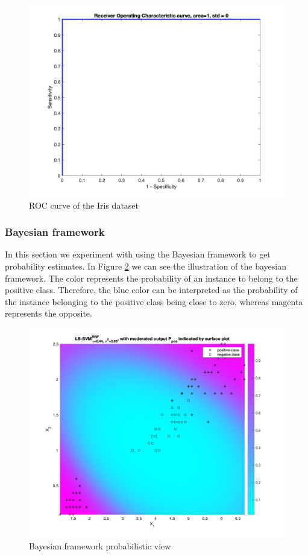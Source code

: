 \documentclass[a4paper, 11pt, one column]{article}
\begin{document}
\begin{figure}[]
    \centering
    \includegraphics[width=12cm]{images/simplex_ROC_dataset.png}
    \caption{ROC curve of the Iris dataset}
    \label{fig:ROCiris}
\end{figure}


\subsubsection{Bayesian framework}
In this section we experiment with using the Bayesian framework\cite{VanGestelTony2002Bffl} to get probability estimates. In Figure \ref{fig:bayesian_report1} we can see the illustration of the bayesian framework. The color represents the probability of an instance to belong to the positive class. Therefore, the blue color can be interpreted as the probability of the instance belonging to the positive class being close to zero, whereas magenta represents the opposite. 

\begin{figure}[]
    \centering
    \includegraphics[width=12cm]{images/bay_plot_colorbar.png}
    \caption{Bayesian framework probabilistic view}
    \label{fig:bayesian_report1}
\end{figure}
\end{document}
